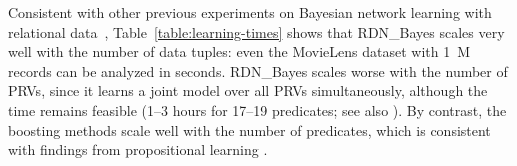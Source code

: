 \documentclass[runningheads,a4paper]{llncs}
\begin{document}
%  
%
%
%  
Consistent with other previous experiments on Bayesian network learning with relational data~\cite{Khosravi2010,Schulte2012}, Table~\ref{table:learning-times} shows that RDN\_Bayes scales very well with the number of data tuples: even the MovieLens dataset with 1~M records can be analyzed in seconds. 
RDN\_Bayes scales worse with the number of PRVs, since it learns a joint model over all PRVs simultaneously,  although the time  remains feasible (1--3 hours for 17--19 predicates; see also \cite{Schulte2012}). By contrast, the boosting methods scale well with the number of predicates, which is consistent with findings from  propositional learning \cite{Heckerman2000}.
\end{document}
